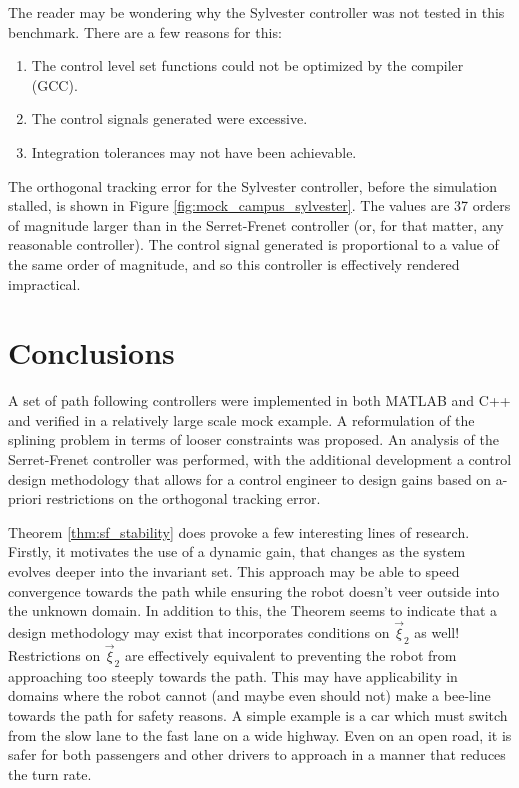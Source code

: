 \documentclass[oneside, 11pt]{book}
\begin{document}
The reader may be wondering why the Sylvester controller was not tested in this benchmark. There are a few reasons for this:
\begin{enumerate}
    \item The control level set functions could not be optimized by the compiler (GCC).
    \item The control signals generated were excessive.
    \item Integration tolerances may not have been achievable.
\end{enumerate}
The orthogonal tracking error for the Sylvester controller, before the simulation stalled, is shown in Figure \ref{fig:mock_campus_sylvester}. The values are 37 orders of magnitude larger than in the Serret-Frenet controller (or, for that matter, any reasonable controller). The control signal generated is proportional to a value of the same order of magnitude, and so this controller is effectively rendered impractical.

\section{Conclusions}
A set of path following controllers were implemented in both MATLAB and C++ and verified in a relatively large scale mock example. A reformulation of the splining problem in terms of looser constraints was proposed. An analysis of the Serret-Frenet controller was performed, with the additional development a control design methodology that allows for a control engineer to design gains based on a-priori restrictions on the orthogonal tracking error.

Theorem \ref{thm:sf_stability} does provoke a few interesting lines of research. Firstly, it motivates the use of a dynamic gain, that changes as the system evolves deeper into the invariant set. This approach may be able to speed convergence towards the path while ensuring the robot doesn't veer outside into the unknown domain. In addition to this, the Theorem seems to indicate that a design methodology may exist that incorporates conditions on $\vec{\xi}_2$ as well! Restrictions on $\vec{\xi}_2$ are effectively equivalent to preventing the robot from approaching too steeply towards the path. This may have applicability in domains where the robot cannot (and maybe even should not) make a bee-line towards the path for safety reasons. A simple example is a car which must switch from the slow lane to the fast lane on a wide highway. Even on an open road, it is safer for both passengers and other drivers to approach in a manner that reduces the turn rate.
\end{document}
